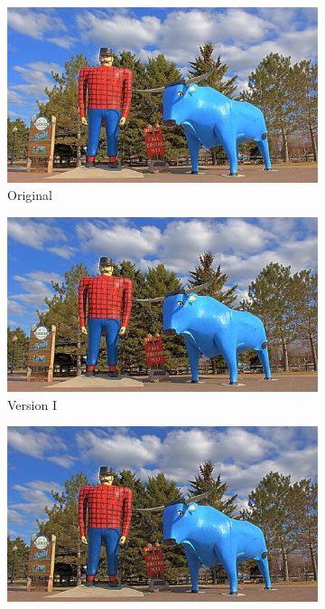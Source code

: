\begin{landscape}
\begin{figure}
\begin{subfigure}[b]{0.40\textwidth}
    \centering
    \includegraphics[width=\textwidth]{figures/chapter5/style_based/PaulBunyan_hdrcandy_v1_small.jpg}
    \caption{Original}
    \label{FigStyle:original_paul_bunyan}
\end{subfigure}\hfill
\begin{subfigure}[b]{0.40\textwidth}
    \centering
    \includegraphics[width=\textwidth]{figures/chapter5/style_based/PaulBunyan_hdrcandy_v2_small.jpg}
    \caption{Version I}
    \label{FigStyle:VerI_paul_bunyan}
\end{subfigure}\hfill
\begin{subfigure}[b]{0.40\textwidth}
    \centering
    \includegraphics[width=\textwidth]{figures/chapter5/style_based/PaulBunyan_hdrcandy_w0_1_small.jpg}

\end{subfigure}
\end{figure}
\end{landscape}
